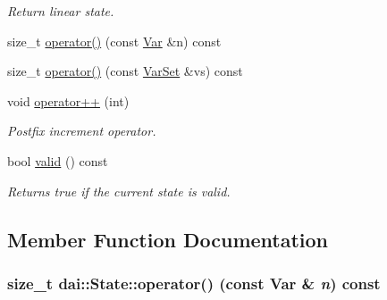 \begin{CompactItemize}
\begin{CompactList}\small\item\em Return linear state. \item\end{CompactList}\item 
size\_\-t \hyperlink{classdai_1_1State_9d4d70438065731f337963da7bff7e61}{operator()} (const \hyperlink{classdai_1_1Var}{Var} \&n) const 
\item 
size\_\-t \hyperlink{classdai_1_1State_475a14df77520317788c13a3386c3e16}{operator()} (const \hyperlink{classdai_1_1VarSet}{VarSet} \&vs) const 
\item 
\hypertarget{classdai_1_1State_e85f3b76bd05070b75b49fd020f4bff6}{
void \hyperlink{classdai_1_1State_e85f3b76bd05070b75b49fd020f4bff6}{operator++} (int)}
\label{classdai_1_1State_e85f3b76bd05070b75b49fd020f4bff6}

\begin{CompactList}\small\item\em Postfix increment operator. \item\end{CompactList}\item 
\hypertarget{classdai_1_1State_08f7e2c1906e32e95dbad09ad26369d2}{
bool \hyperlink{classdai_1_1State_08f7e2c1906e32e95dbad09ad26369d2}{valid} () const }
\label{classdai_1_1State_08f7e2c1906e32e95dbad09ad26369d2}

\begin{CompactList}\small\item\em Returns true if the current state is valid. \item\end{CompactList}\end{CompactItemize}


\subsection{Member Function Documentation}
\hypertarget{classdai_1_1State_9d4d70438065731f337963da7bff7e61}{
\subsubsection[operator()]{\setlength{\rightskip}{0pt plus 5cm}size\_\-t dai::State::operator() (const {\bf Var} \& {\em n}) const}}
\label{classdai_1_1State_9d4d70438065731f337963da7bff7e61}


